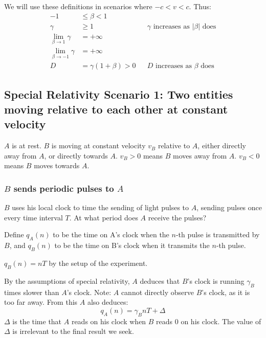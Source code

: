 \documentclass[a4paper]{article}
\theoremstyle{plain}
\theoremstyle{definition}
\begin{document}
We will use these definitions in scenarios where $-c < v < c$.
Thus:
\begin{align}
-1 & \leq \beta < 1 \nonumber \\
\gamma & \geq 1 & & \text{$\gamma$ increases as $|\beta|$ does} \nonumber \\
\lim_{\beta \rightarrow 1} \gamma & = +\infty \nonumber \\
\lim_{\beta \rightarrow -1} \gamma & = +\infty \nonumber \\
D & = \gamma (1+\beta) > 0 & & \text{$D$ increases as $\beta$ does} \label{eqn:DaltFormula}
\end{align}


\subsection{Special Relativity Scenario 1: Two entities moving relative to each other at constant velocity}
\label{sec:scen1}

$A$ is at rest.  $B$ is moving at constant velocity $v_B$ relative to $A$,
either directly away from $A$, or directly towards $A$.
$v_B > 0$ means $B$ moves away from $A$.
$v_B < 0$ means $B$ moves towards $A$.


\subsubsection{$B$ sends periodic pulses to $A$}
\label{sec:scen1BtoA}

$B$ uses his local clock to time the sending of light pulses to $A$,
sending pulses once every time interval $T$.
At what period does $A$ receive the pulses?

Define $q_A(n)$ to be the time on A's clock when the $n$-th pulse is
transmitted by $B$, and $q_B(n)$ to be the time on B's clock when it
transmits the $n$-th pulse.

$q_B(n) = nT$ by the setup of the experiment.

By the assumptions of special relativity, $A$ deduces that $B$'s clock
is running $\gamma_B$ times slower than $A$'s clock.  Note: $A$ cannot
directly observe $B$'s clock, as it is too far away.  From this $A$
also deduces:
\begin{equation}
q_A(n) = \gamma_B nT + \Delta  \label{eqn:scen1timeA}
\end{equation}
$\Delta$ is the time that $A$ reads on his clock
when $B$ reads 0 on his clock.  The value of $\Delta$
is irrelevant to the final result we seek.
\end{document}
